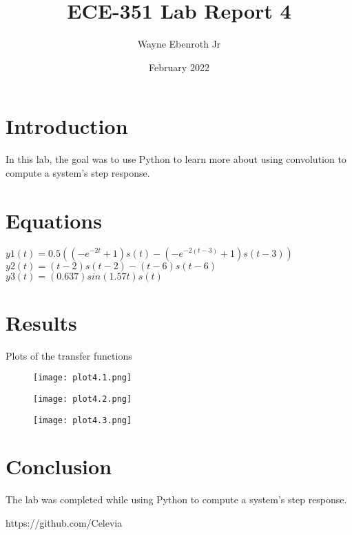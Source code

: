 \documentclass{article}
\title{ECE-351 Lab Report 4}
\author{Wayne Ebenroth Jr }
\date{February 2022}
\begin{document}
\maketitle
\pagebreak
\section{Introduction}
In this lab, the goal was to use Python to learn more about using convolution to compute a system’s step response. 

\section{Equations}

$y1(t) = 0.5((-e^{-2t}+1)s(t) - (-e^{-2(t-3)}+1)s(t-3))$\\
$y2(t) = (t-2)s(t-2) - (t-6)s(t-6)$\\
$y3(t) = (0.637)sin(1.57t)s(t)$


\section{Results}
Plots of the transfer functions\\
\begin{figure}[ht]
\texttt{[image: plot4.1.png]}
\caption{}
\end{figure}

\begin{figure}[ht]
\texttt{[image: plot4.2.png]}
\caption{}
\end{figure}

\begin{figure}[ht]
\texttt{[image: plot4.3.png]}
\caption{}
\end{figure}



\section{Conclusion}
The lab was completed while using Python to compute a system's step response.

https://github.com/Celevia
\end{document}
